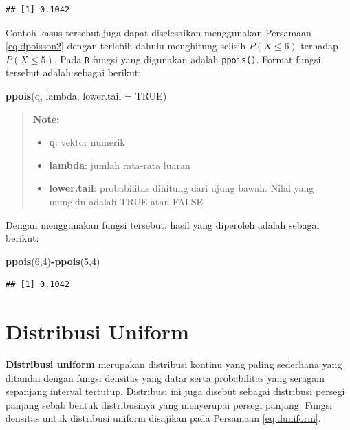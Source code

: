 \documentclass[]{book}
\newenvironment{Shaded}{\begin{snugshade}}{\end{snugshade}}
\newcommand{\KeywordTok}[1]{\textcolor[rgb]{0.13,0.29,0.53}{\textbf{#1}}}
\newcommand{\DataTypeTok}[1]{\textcolor[rgb]{0.13,0.29,0.53}{#1}}
\newcommand{\DecValTok}[1]{\textcolor[rgb]{0.00,0.00,0.81}{#1}}
\newcommand{\OtherTok}[1]{\textcolor[rgb]{0.56,0.35,0.01}{#1}}
\newcommand{\OperatorTok}[1]{\textcolor[rgb]{0.81,0.36,0.00}{\textbf{#1}}}
\newcommand{\NormalTok}[1]{#1}
\providecommand{\tightlist}{%
  \setlength{\itemsep}{0pt}\setlength{\parskip}{0pt}}
\begin{document}
\begin{verbatim}
## [1] 0.1042
\end{verbatim}

Contoh kasus tersebut juga dapat diselesaikan menggunakan Persamaan
\eqref{eq:dpoisson2} dengan terlebih dahulu menghitung selisih
\(P(X\le6)\) terhadap \(P(X\le5)\). Pada \texttt{R} fungsi yang
digunakan adalah \texttt{ppois()}. Format fungsi tersebut adalah sebagai
berikut:

\begin{Shaded}
\begin{Highlighting}[]
\KeywordTok{ppois}\NormalTok{(q, lambda, }\DataTypeTok{lower.tail =} \OtherTok{TRUE}\NormalTok{)}
\end{Highlighting}
\end{Shaded}

\begin{quote}
\textbf{Note: }

\begin{itemize}
\tightlist
\item
  \textbf{q}: vektor numerik
\item
  \textbf{lambda}: jumlah rata-rata luaran
\item
  \textbf{lower.tail}: probabilitas dihitung dari ujung bawah. Nilai
  yang mungkin adalah TRUE atau FALSE
\end{itemize}
\end{quote}

Dengan menggunakan fungsi tersebut, hasil yang diperoleh adalah sebagai
berikut:

\begin{Shaded}
\begin{Highlighting}[]
\KeywordTok{ppois}\NormalTok{(}\DecValTok{6}\NormalTok{,}\DecValTok{4}\NormalTok{)}\OperatorTok{-}\KeywordTok{ppois}\NormalTok{(}\DecValTok{5}\NormalTok{,}\DecValTok{4}\NormalTok{)}
\end{Highlighting}
\end{Shaded}

\begin{verbatim}
## [1] 0.1042
\end{verbatim}

\section{Distribusi Uniform}\label{distribusi-uniform}

\textbf{Distribusi uniform} merupakan distribusi kontinu yang paling
sederhana yang ditandai dengan fungsi densitas yang datar serta
probabilitas yang seragam sepanjang interval tertutup. Distribusi ini
juga disebut sebagai distribusi persegi panjang sebab bentuk
distribusinya yang menyerupai persegi panjang. Fungsi densitas untuk
distribusi uniform disajikan pada Persamaan \eqref{eq:duniform}.
\end{document}

